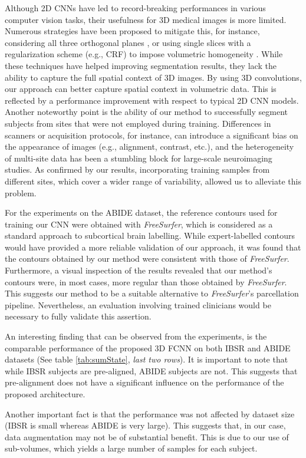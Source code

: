 \documentclass[twoside,fleqn,espcrc2]{elsarticle}
\newcommand{\FreeSurfer}{\textit{FreeSurfer}}
\begin{document}
Although 2D CNNs have led to record-breaking performances in various computer vision tasks, their usefulness for 3D medical images is more limited. Numerous strategies have been proposed to mitigate this, for instance, considering all three orthogonal planes \cite{Brebisson2015deep}, or using single slices with a regularization scheme (e.g., CRF) to impose volumetric homogeneity \cite{shakeri2016sub}. While these techniques have helped improving segmentation results, they lack the ability to capture the full spatial context of 3D images. By using 3D convolutions, our approach can better capture spatial context in volumetric data. This is reflected by a performance improvement with respect to typical 2D CNN models. Another noteworthy point is the ability of our method to successfully segment subjects from sites that were not employed during training. Differences in scanners or acquisition protocols, for instance, can introduce a significant bias on the appearance of images (e.g., alignment, contrast, etc.), and the heterogeneity of multi-site data has been a stumbling block for large-scale neuroimaging studies. As confirmed by our results, incorporating training samples from different sites, which cover a wider range of variability, allowed us to alleviate this problem.

For the experiments on the ABIDE dataset, the reference contours used for training our CNN were obtained with \FreeSurfer{}, which is considered as a standard approach to subcortical brain labelling. While expert-labelled contours would have provided a more reliable validation of our approach, it was found that the contours obtained by our method were consistent with those of \FreeSurfer{}. Furthermore, a visual inspection of the results revealed that our method's contours were, in most cases, more regular than those obtained by \FreeSurfer{}. This suggests our method to be a suitable alternative to \FreeSurfer{}'s parcellation pipeline. Nevertheless, an evaluation involving trained clinicians would be necessary to fully validate this assertion.

An interesting finding that can be observed from the experiments, is the comparable performance of the proposed 3D FCNN on both IBSR and ABIDE datasets (See table \ref{tab:sumState}, \textit{last two rows}). It is important to note that while IBSR subjects are pre-aligned, ABIDE subjects are not. This suggests that pre-alignment does not have a significant influence on the performance of the proposed architecture.

Another important fact is that the performance was not affected by dataset size (IBSR is small whereas ABIDE is very large).
This suggests that, in our case, data augmentation may not be of substantial benefit. This is due to our use of sub-volumes, which yields a large number of samples for each subject.
\end{document}
